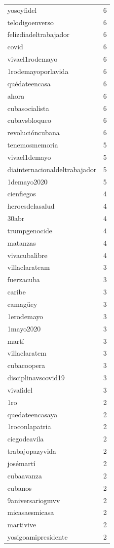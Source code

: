 \begin{tabular}{lr}
yosoyfidel & 6 \\
telodigoenverso & 6 \\
felizdiadeltrabajador & 6 \\
covid & 6 \\
vivael1rodemayo & 6 \\
1rodemayoporlavida & 6 \\
quédateencasa & 6 \\
ahora & 6 \\
cubasocialista & 6 \\
cubavsbloqueo & 6 \\
revolucióncubana & 6 \\
tenemosmemoria & 5 \\
vivael1demayo & 5 \\
diainternacionaldeltrabajador & 5 \\
1demayo2020 & 5 \\
cienfiegos & 4 \\
heroesdelasalud & 4 \\
30abr & 4 \\
trumpgenocide & 4 \\
matanzas & 4 \\
vivacubalibre & 4 \\
villaclarateam & 3 \\
fuerzacuba & 3 \\
caribe & 3 \\
camagüey & 3 \\
1erodemayo & 3 \\
1mayo2020 & 3 \\
martí & 3 \\
villaclaratem & 3 \\
cubacoopera & 3 \\
disciplinavscovid19 & 3 \\
vivafidel & 3 \\
1ro & 2 \\
quedateencasaya & 2 \\
1roconlapatria & 2 \\
ciegodeavila & 2 \\
trabajopazyvida & 2 \\
josémartí & 2 \\
cubaavanza & 2 \\
cubanos & 2 \\
9aniversariogmvv & 2 \\
micasaesmicasa & 2 \\
martivive & 2 \\
yosigoamipresidente & 2 \\

\end{tabular}
